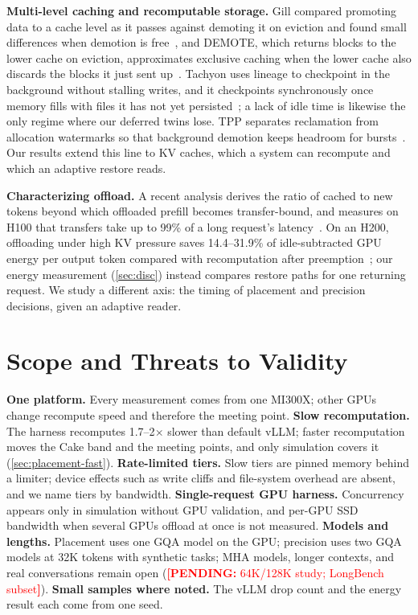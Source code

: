 \documentclass[conference]{IEEEtran}
\newcommand{\pending}[1]{\textcolor{red}{\textbf{[PENDING:} #1\textbf{]}}}
\begin{document}
\textbf{Multi-level caching and recomputable storage.}
Gill compared promoting data to a cache level as it passes against demoting it on eviction and found small differences when demotion is free~\cite{gill2008}, and DEMOTE, which returns blocks to the lower cache on eviction, approximates exclusive caching when the lower cache also discards the blocks it just sent up~\cite{wong2002}.
Tachyon uses lineage to checkpoint in the background without stalling writes, and it checkpoints synchronously once memory fills with files it has not yet persisted~\cite{tachyon2014}; a lack of idle time is likewise the only regime where our deferred twins lose.
TPP separates reclamation from allocation watermarks so that background demotion keeps headroom for bursts~\cite{tpp2023}.
Our results extend this line to KV caches, which a system can recompute and which an adaptive restore reads.

\textbf{Characterizing offload.}
A recent analysis derives the ratio of cached to new tokens beyond which offloaded prefill becomes transfer-bound, and measures on H100 that transfers take up to 99\% of a long request's latency~\cite{bottlenecks2026}.
On an H200, offloading under high KV pressure saves 14.4--31.9\% of idle-subtracted GPU energy per output token compared with recomputation after preemption~\cite{hotcarbon2026}; our energy measurement (\cref{sec:disc}) instead compares restore paths for one returning request.
We study a different axis: the timing of placement and precision decisions, given an adaptive reader.

\section{Scope and Threats to Validity}\label{sec:threats}
\textbf{One platform.} Every measurement comes from one MI300X; other GPUs change recompute speed and therefore the meeting point.
\textbf{Slow recomputation.} The harness recomputes 1.7--2$\times$ slower than default vLLM; faster recomputation moves the Cake band and the meeting points, and only simulation covers it (\cref{sec:placement-fast}).
\textbf{Rate-limited tiers.} Slow tiers are pinned memory behind a limiter; device effects such as write cliffs and file-system overhead are absent, and we name tiers by bandwidth.
\textbf{Single-request GPU harness.} Concurrency appears only in simulation without GPU validation, and per-GPU SSD bandwidth when several GPUs offload at once is not measured.
\textbf{Models and lengths.} Placement uses one GQA model on the GPU; precision uses two GQA models at 32K tokens with synthetic tasks; MHA models, longer contexts, and real conversations remain open (\pending{64K/128K study; LongBench subset}).
\textbf{Small samples where noted.} The vLLM drop count and the energy result each come from one seed.
\end{document}
